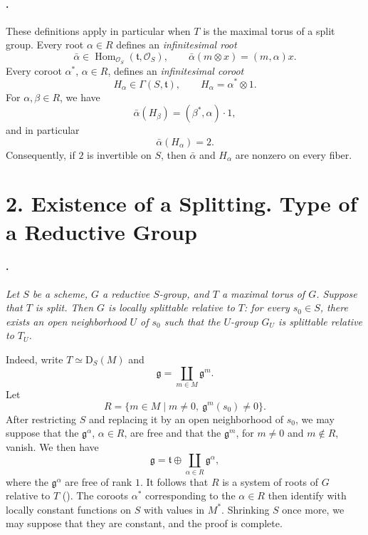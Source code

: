 \paragraph{.}
These definitions apply in particular when \(T\) is the maximal
torus of a split group. Every root \(\alpha\in R\) defines an
\emph{infinitesimal root}
\[
  \bar\alpha\in
  \operatorname{Hom}_{\mathcal O_S}(\mathfrak t,\mathcal O_S),
  \qquad
  \bar\alpha(m\otimes x)=(m,\alpha)x.
\]
Every coroot \(\alpha^*\), \(\alpha\in R\), defines an
\emph{infinitesimal coroot}
\[
  H_\alpha\in\Gamma(S,\mathfrak t),
  \qquad
  H_\alpha=\alpha^*\otimes 1.
\]
For \(\alpha,\beta\in R\), we have
\[
  \bar\alpha(H_\beta)=(\beta^*,\alpha)\cdot 1,
\]
and in particular
\[
  \bar\alpha(H_\alpha)=2.
\]
Consequently, if \(2\) is invertible on \(S\), then
\(\bar\alpha\) and \(H_\alpha\) are nonzero on every fiber.

\section*{2. Existence of a
Splitting. Type of a Reductive Group}

\paragraph{.}
\textit{Let \(S\) be a scheme, \(G\) a reductive \(S\)-group, and
\(T\) a maximal torus of \(G\). Suppose that \(T\) is split. Then
\(G\) is locally splittable relative to \(T\): for every
\(s_0\in S\), there exists an open neighborhood \(U\) of \(s_0\)
such that the \(U\)-group \(G_U\) is splittable relative to
\(T_U\).}

Indeed, write \(T\simeq\mathrm D_S(M)\) and
\[
  \mathfrak g=\coprod_{m\in M}\mathfrak g^m.
\]
Let
\[
  R=\{m\in M\mid m\ne0,\ \mathfrak g^m(s_0)\ne0\}.
\]
After restricting \(S\) and replacing it by an open neighborhood
of \(s_0\), we may suppose that the \(\mathfrak g^\alpha\),
\(\alpha\in R\), are free and that the \(\mathfrak g^m\), for
\(m\ne0\) and \(m\notin R\), vanish. We then have
\[
  \mathfrak g
  =
  \mathfrak t\oplus
  \coprod_{\alpha\in R}\mathfrak g^\alpha,
\]
where the \(\mathfrak g^\alpha\) are free of rank \(1\). It follows
that \(R\) is a system of roots of \(G\) relative to \(T\)
\textup{()}. The coroots \(\alpha^*\) corresponding
to the \(\alpha\in R\) then identify with locally constant
functions on \(S\) with values in \(M^*\). Shrinking \(S\) once
more, we may suppose that they are constant, and the proof is
complete.

